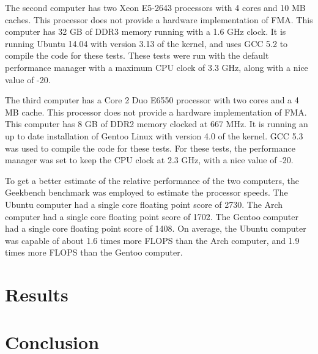 \documentclass{cccg16}
\begin{document}
The second computer has two Xeon E5-2643 processors with 4 cores and
10 MB caches.  This processor does not provide a hardware
implementation of FMA.  This computer has 32 GB of DDR3 memory running
with a 1.6 GHz clock.  It is running Ubuntu 14.04 with version 3.13 of
the kernel, and uses GCC 5.2 to compile the code for these tests.
These tests were run with the default performance manager with a
maximum CPU clock of 3.3 GHz, along with a nice value of -20.

The third computer has a Core 2 Duo E6550 processor with two cores and
a 4 MB cache.  This processor does not provide a hardware
implementation of FMA.  This computer has 8 GB of DDR2 memory clocked
at 667 MHz.  It is running an up to date installation of Gentoo Linux
with version 4.0 of the kernel.  GCC 5.3 was used to compile the code
for these tests.  For these tests, the performance manager was set to
keep the CPU clock at 2.3 GHz, with a nice value of -20.

To get a better estimate of the relative performance of the two
computers, the Geekbench benchmark was employed to estimate the
processor speeds.  The Ubuntu computer had a single core floating
point score of 2730.  The Arch computer had a single core floating
point score of 1702.  The Gentoo computer had a single core floating
point score of 1408.  On average, the Ubuntu computer was capable of
about 1.6 times more FLOPS than the Arch computer, and 1.9 times more
FLOPS than the Gentoo computer.

\section{Results}
\section{Conclusion}



\end{document}
